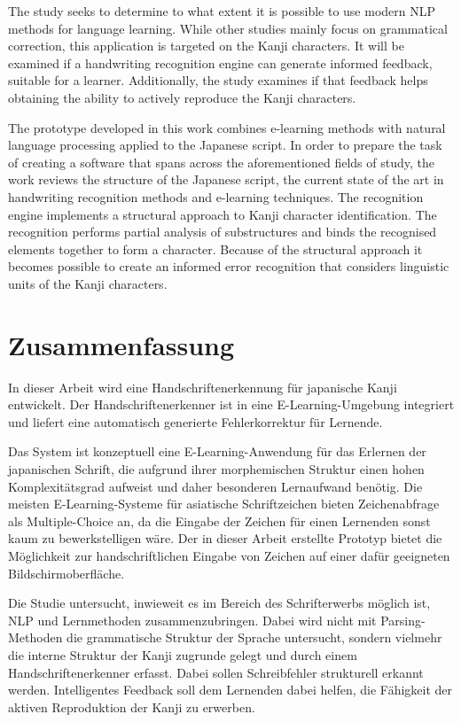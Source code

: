 The study seeks to determine to what extent it is possible to use modern NLP 
methods for language learning. While other studies mainly focus on grammatical
correction, this application is targeted on the Kanji characters. It will be 
examined if a handwriting recognition engine can generate informed feedback,
suitable for a learner. Additionally, the study examines if that feedback helps 
obtaining the ability to actively reproduce the Kanji characters.

The prototype developed in this work combines e-learning methods with natural
language processing applied to the Japanese script. In order to prepare the 
task of creating a software that spans across the aforementioned fields of study,
the work reviews the structure of the Japanese script, the current state of 
the art in handwriting recognition methods and e-learning techniques.
The recognition engine implements a structural approach to Kanji character 
identification. The recognition performs partial analysis of substructures
and binds the recognised elements together to form a character.
Because of the structural approach it becomes possible to create an informed
error recognition that considers linguistic units of the Kanji characters.

\chapter*{Zusammenfassung}
\label{chap:zusammenfassung}

In dieser Arbeit wird eine Handschriftenerkennung für japanische Kanji 
entwickelt. Der Handschriftenerkenner ist in eine E-Learning-Umgebung integriert und
liefert eine automatisch generierte Fehlerkorrektur für Lernende.

Das System ist konzeptuell eine E-Learning-Anwendung für das Erlernen 
der japanischen Schrift, die aufgrund ihrer morphemischen Struktur einen
hohen Komplexitätsgrad aufweist und daher besonderen Lernaufwand benötig.
Die meisten E-Learning-Systeme für asiatische Schriftzeichen bieten Zeichenabfrage
als Multiple-Choice an, da die Eingabe der Zeichen für einen Lernenden sonst kaum 
zu bewerkstelligen wäre. Der in dieser Arbeit erstellte Prototyp bietet die Möglichkeit 
zur handschriftlichen Eingabe von Zeichen auf einer dafür geeigneten Bildschirmoberfläche.

Die Studie untersucht, inwieweit es im Bereich des Schrifterwerbs möglich ist, 
NLP und Lernmethoden zusammenzubringen. Dabei wird nicht 
mit Parsing-Methoden die grammatische Struktur der Sprache untersucht,
sondern vielmehr die interne Struktur der Kanji zugrunde gelegt und
durch einem Handschriftenerkenner erfasst. Dabei sollen Schreibfehler 
strukturell erkannt werden. Intelligentes Feedback soll dem Lernenden
dabei helfen, die Fähigkeit der aktiven Reproduktion der Kanji zu erwerben.

